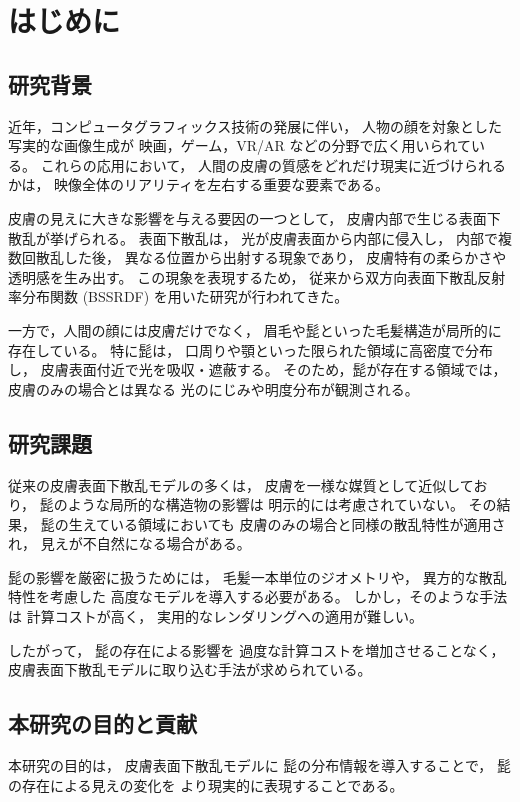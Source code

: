 ﻿\chapter{はじめに}
\label{cha:introduction}

\section{研究背景}
近年，コンピュータグラフィックス技術の発展に伴い，
人物の顔を対象とした写実的な画像生成が
映画，ゲーム，VR/AR などの分野で広く用いられている。
これらの応用において，
人間の皮膚の質感をどれだけ現実に近づけられるかは，
映像全体のリアリティを左右する重要な要素である。

皮膚の見えに大きな影響を与える要因の一つとして，
皮膚内部で生じる表面下散乱が挙げられる。
表面下散乱は，
光が皮膚表面から内部に侵入し，
内部で複数回散乱した後，
異なる位置から出射する現象であり，
皮膚特有の柔らかさや透明感を生み出す。
この現象を表現するため，
従来から双方向表面下散乱反射率分布関数
(BSSRDF) を用いた研究が行われてきた。

一方で，人間の顔には皮膚だけでなく，
眉毛や髭といった毛髪構造が局所的に存在している。
特に髭は，
口周りや顎といった限られた領域に高密度で分布し，
皮膚表面付近で光を吸収・遮蔽する。
そのため，髭が存在する領域では，
皮膚のみの場合とは異なる
光のにじみや明度分布が観測される。

\section{研究課題}
従来の皮膚表面下散乱モデルの多くは，
皮膚を一様な媒質として近似しており，
髭のような局所的な構造物の影響は
明示的には考慮されていない。
その結果，
髭の生えている領域においても
皮膚のみの場合と同様の散乱特性が適用され，
見えが不自然になる場合がある。

髭の影響を厳密に扱うためには，
毛髪一本単位のジオメトリや，
異方的な散乱特性を考慮した
高度なモデルを導入する必要がある。
しかし，そのような手法は
計算コストが高く，
実用的なレンダリングへの適用が難しい。

したがって，
髭の存在による影響を
過度な計算コストを増加させることなく，
皮膚表面下散乱モデルに取り込む手法が求められている。

\section{本研究の目的と貢献}
本研究の目的は，
皮膚表面下散乱モデルに
髭の分布情報を導入することで，
髭の存在による見えの変化を
より現実的に表現することである。

